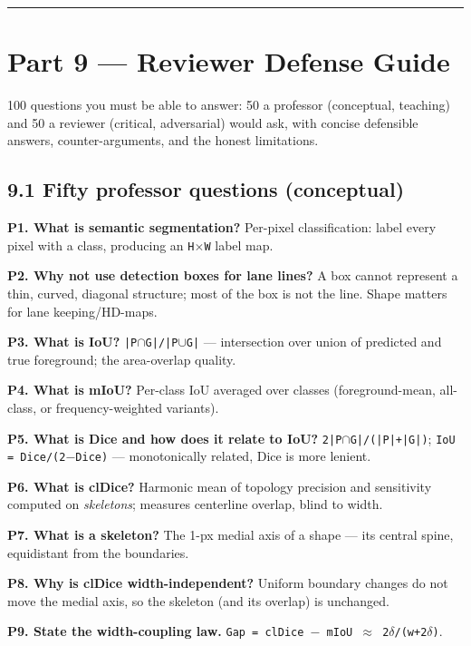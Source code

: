 \documentclass[11pt]{article}
\begin{document}
\vspace{3pt}\hrule\vspace{3pt}
\clearpage\section*{Part 9 --- Reviewer Defense Guide}

100 questions you must be able to answer: 50 a professor (conceptual, teaching) and 50 a reviewer (critical, adversarial) would ask, with concise defensible answers, counter-arguments, and the honest limitations.

\subsection*{9.1 Fifty professor questions (conceptual)}

\textbf{P1. What is semantic segmentation?} Per-pixel classification: label every pixel with a class, producing an \texttt{H$\times$W} label map.

\textbf{P2. Why not use detection boxes for lane lines?} A box cannot represent a thin, curved, diagonal structure; most of the box is not the line. Shape matters for lane keeping/HD-maps.

\textbf{P3. What is IoU?} \texttt{|P$\cap$G|/|P$\cup$G|} --- intersection over union of predicted and true foreground; the area-overlap quality.

\textbf{P4. What is mIoU?} Per-class IoU averaged over classes (foreground-mean, all-class, or frequency-weighted variants).

\textbf{P5. What is Dice and how does it relate to IoU?} \texttt{2|P$\cap$G|/(|P|+|G|)}; \texttt{IoU = Dice/(2$-$Dice)} --- monotonically related, Dice is more lenient.

\textbf{P6. What is clDice?} Harmonic mean of topology precision and sensitivity computed on \textit{skeletons}; measures centerline overlap, blind to width.

\textbf{P7. What is a skeleton?} The 1-px medial axis of a shape --- its central spine, equidistant from the boundaries.

\textbf{P8. Why is clDice width-independent?} Uniform boundary changes do not move the medial axis, so the skeleton (and its overlap) is unchanged.

\textbf{P9. State the width-coupling law.} \texttt{Gap = clDice $-$ mIoU $\approx$ 2$\delta$/(w+2$\delta$)}.
\end{document}

